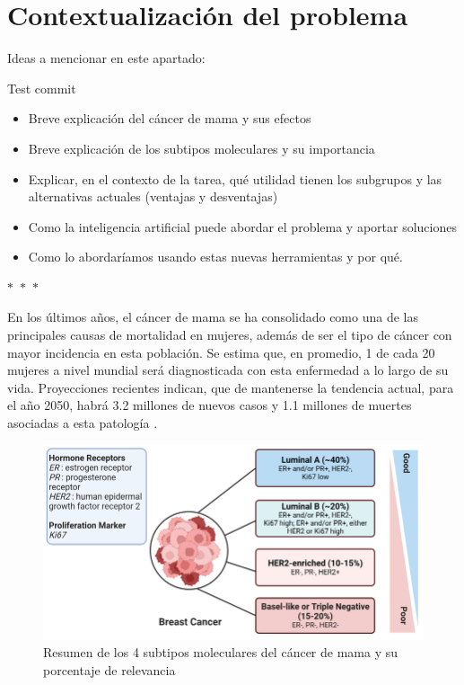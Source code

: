 \documentclass[a4paper,10pt]{book}
\begin{document}
\section{Contextualización del problema}


Ideas a mencionar en este apartado:

Test commit

\begin{itemize}
  \item Breve explicación del cáncer de mama y sus efectos
  \item Breve explicación de los subtipos moleculares y su importancia
  \item Explicar, en el contexto de la tarea, qué utilidad tienen los subgrupos y las alternativas actuales (ventajas y desventajas)
  \item Como la inteligencia artificial puede abordar el problema y aportar soluciones
  \item Como lo abordaríamos usando estas nuevas herramientas y por qué.
\end{itemize}

\begin{center}
  $\ast$~$\ast$~$\ast$
\end{center}

En los últimos años, el cáncer de mama se ha consolidado como una de las principales causas de mortalidad en mujeres, además de ser el tipo de cáncer con mayor incidencia en esta población. Se estima que, en promedio, 1 de cada 20 mujeres a nivel mundial será diagnosticada con esta enfermedad a lo largo de su vida. Proyecciones recientes indican, que de mantenerse la tendencia actual, para el año 2050, habrá 3.2 millones de nuevos casos y 1.1 millones de muertes asociadas a esta patología \cite{kim_global_2025}.


\begin{figure}
    \centering
    \includegraphics[width=0.8\linewidth]{reports/assets/subtypes.png}
    \caption{Resumen de los 4 subtipos moleculares del cáncer de mama y su porcentaje de relevancia \cite{harnessing_2024}}
    \label{fig:subtypes}
\end{figure}
\end{document}
